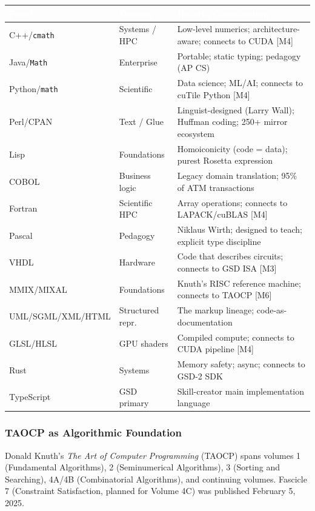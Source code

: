 \documentclass[11pt,letterpaper]{article}
\newcommand{\tableheader}[1]{\textbf{\sffamily\textcolor{white}{#1}}}
\begin{document}
\begin{center}
\begin{tabularx}{\textwidth}{L{3cm}L{3.5cm}X}
\toprule
{}
\tableheader{Panel} & \tableheader{Domain} & \tableheader{Rosetta Contribution} \\
\midrule
C++/\texttt{cmath} & Systems / HPC & Low-level numerics; architecture-aware; connects to CUDA [M4] \\
Java/\texttt{Math} & Enterprise & Portable; static typing; pedagogy (AP CS) \\
Python/\texttt{math} & Scientific & Data science; ML/AI; connects to cuTile Python [M4] \\
Perl/CPAN & Text / Glue & Linguist-designed (Larry Wall); Huffman coding; 250+ mirror ecosystem \\
Lisp & Foundations & Homoiconicity (code = data); purest Rosetta expression \\
COBOL & Business logic & Legacy domain translation; 95\% of ATM transactions \\
Fortran & Scientific HPC & Array operations; connects to LAPACK/cuBLAS [M4] \\
Pascal & Pedagogy & Niklaus Wirth; designed to teach; explicit type discipline \\
VHDL & Hardware & Code that describes circuits; connects to GSD ISA [M3] \\
MMIX/MIXAL & Foundations & Knuth's RISC reference machine; connects to TAOCP [M6] \\
UML/SGML/XML/HTML & Structured repr. & The markup lineage; code-as-documentation \\
GLSL/HLSL & GPU shaders & Compiled compute; connects to CUDA pipeline [M4] \\
Rust & Systems & Memory safety; async; connects to GSD-2 SDK \\
TypeScript & GSD primary & Skill-creator main implementation language \\
\bottomrule
\end{tabularx}
\end{center}

\subsubsection{TAOCP as Algorithmic Foundation}

Donald Knuth's \textit{The Art of Computer Programming} (TAOCP) spans volumes 1 (Fundamental Algorithms), 2 (Seminumerical Algorithms), 3 (Sorting and Searching), 4A/4B (Combinatorial Algorithms), and continuing volumes. Fascicle 7 (Constraint Satisfaction, planned for Volume 4C) was published February 5, 2025.
\end{document}
